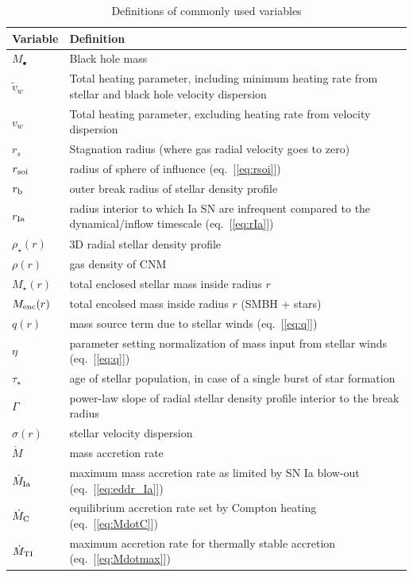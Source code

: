 \documentclass[usenatbib,fleqn]{mn2e}
\begin{document}
\begin{table}
\begin{threeparttable}
\begin{minipage}{18cm}
\caption{Definitions of commonly used variables}
\begin{tabular}{ll}
\hline
{Variable} & {Definition} \\
\hline
$M_{\bullet}$ & Black hole mass \\
$\tilde{v}_{w}$ & Total heating parameter, including minimum heating
rate from stellar and black hole velocity dispersion \\
$v_{w}$ & Total heating parameter, excluding heating rate from velocity dispersion \\
$r_{s}$ & Stagnation radius (where gas radial velocity goes to zero) \\
$r_{\rm soi}$ & radius of sphere of influence (eq.~[\ref{eq:rsoi}]) \\
$r_{\rm b}$ & outer break radius of stellar density profile \\ 
$r_{\rm Ia}$ & radius interior to which Ia SN are infrequent compared to the dynamical/inflow timescale (eq.~[\ref{eq:rIa}]) \\ 
$\rho_{\star}(r)$ & 3D radial stellar density profile \\
$\rho(r)$ & gas density of CNM \\
$M_{\star}(r)$ & total enclosed stellar mass inside radius $r$ \\
$M_{\rm enc}(r)$ & total encolsed mass inside radius $r$ (SMBH + stars) \\
$q(r)$ & mass source term due to stellar winds (eq.~[\ref{eq:q}]) \\
$\eta$ & parameter setting normalization of mass input from stellar winds (eq.~[\ref{eq:q}]) \\
$\tau_{\star}$ & age of stellar population, in case of a single burst of star formation \\
$\Gamma$ & power-law slope of radial stellar density profile interior to the break radius \\
$\sigma(r)$ & stellar velocity dispersion \\
$\dot{M}$ & mass accretion rate \\
$\dot{M}_{\rm Ia}$ & maximum mass accretion rate as limited by SN Ia blow-out (eq.~[\ref{eq:eddr_Ia}]) \\
$\dot{M}_{\rm C}$ & equilibrium accretion rate set by Compton heating (eq.~[\ref{eq:MdotC}]) \\
$\dot{M}_{\rm TI}$ & maximum accretion rate for thermally stable accretion (eq.~[\ref{eq:Mdotmax}]) \\

\end{tabular}
\end{minipage}
\end{threeparttable}
\end{table}
\end{document}
